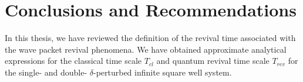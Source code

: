 \chapter{Conclusions and Recommendations}
\label{conclusions}

\hspace{\parindent} In this thesis, we have reviewed the definition of the revival time associated with the wave packet revival phenomena. We have obtained approximate analytical expressions for the classical time scale $T_{cl}$ and quantum revival time scale $T_{rev}$ for the single- and double- $\delta$-perturbed infinite square well system.

